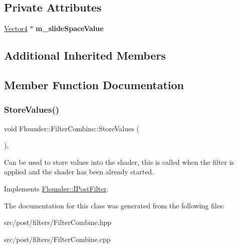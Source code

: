 \subsection*{Private Attributes}
\begin{DoxyCompactItemize}
\item 
\mbox{\label{class_flounder_1_1_filter_combine_ab6ba72a325e627709e164970124e1270}} 
\hyperlink{class_flounder_1_1_vector4}{Vector4} $\ast$ {\bfseries m\+\_\+slide\+Space\+Value}
\end{DoxyCompactItemize}
\subsection*{Additional Inherited Members}


\subsection{Member Function Documentation}
\mbox{\label{class_flounder_1_1_filter_combine_af35e32eed5f1f9146e2189e6ca6c33c9}} 
\subsubsection{\texorpdfstring{Store\+Values()}{StoreValues()}}
{\footnotesize\ttfamily void Flounder\+::\+Filter\+Combine\+::\+Store\+Values (\begin{DoxyParamCaption}{ }\end{DoxyParamCaption})\hspace{0.3cm}{\ttfamily [override]}, {\ttfamily [virtual]}}



Can be used to store values into the shader, this is called when the filter is applied and the shader has been already started. 



Implements \hyperlink{class_flounder_1_1_i_post_filter_a20420ec0a9bac67437740552bea9ab74}{Flounder\+::\+I\+Post\+Filter}.



The documentation for this class was generated from the following files\+:\begin{DoxyCompactItemize}
\item 
src/post/filters/Filter\+Combine.\+hpp\item 
src/post/filters/Filter\+Combine.\+cpp\end{DoxyCompactItemize}
